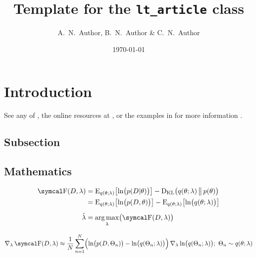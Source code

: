 \documentclass[a4paper, 11pt]{lt_article}
\title{Template for the \texttt{lt\_article} class}
\author{A.~N.~Author, B.~N.~Author \& C.~N.~Author}
\date{\today}
\begin{document}
\maketitle

\begin{abstract} %

\noindent\blindtext

\end{abstract}
\section{Introduction} %

\blindtext See any of \textcite{Bayes}, the online resources at
, or the examples in
 for more information \autocite{GravitationalWaves}.

\subsection{Subsection} %

\Blindtext[3]

\subsection{Mathematics} %

\begin{equation}
\begin{split}
    \func{\FreeEnergy}{D, \lambda}
    & = \expecWRT{ \lnFunc{\cDist{p}{D}{\theta}} }{ \pDist{q}{\theta}{\lambda} }
    - \DKL{ \pDist{q}{\theta}{\lambda} }{ \dist{p}{\theta} }
    \\
    & = \expecWRT{ \lnFunc{\dist{p}{D, \theta}} }{ \pDist{q}{\theta}{\lambda} }
    - \expecWRT{ \lnFunc{\pDist{q}{\theta}{\lambda}} }{ \pDist{q}{\theta}{\lambda} }
    \\[5pt]
    \hat{\lambda}
    & = \Func{ \argmax_{\lambda} }{ \func{\FreeEnergy}{D, \lambda} }
\end{split}
\end{equation}

\begin{equation}
    \del_{\lambda} \func{\FreeEnergy}{D, \lambda}
    \approx
    \frac{1}{N} \sum_{n=1}^{N} \Bigl(
        \lnFunc{\dist{p}{D, \Theta_{n}}}
        - \lnFunc{\pDist{q}{\Theta_{n}}{\lambda}}
    \Bigr)
    \del_{\lambda} \lnFunc{\pDist{q}{\Theta_{n}}{\lambda}};
    \,\, \Theta_{n} \sim \pDist{q}{\theta}{\lambda}
\end{equation}
\end{document}
